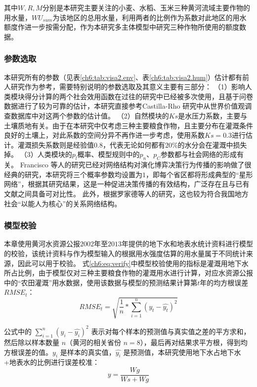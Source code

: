 其中$W, R, M$分别是本研究主要关注的小麦、水稻、玉米三种黄河流域主要作物的用水量，$WU_{sum}$为该地区的总用水量，利用两者的比例作为系数对此地区的用水额度作进一步按需分配，作为本研究多主体模型中研究三种作物所使用的额度数据。



\subsubsection{参数选取}

本研究所有的参数（见表\ref{ch6:tab:visa2.env}、表\ref{ch6:tab:visa2.hum}）估计都有前人研究作为参考，需要特别说明的参数选取及其意义主要有三部分：
（1）影响人类模块得分计算的两个社会效用函数在过往的研究中已经被多次使用，且基于问卷数据进行了较为可靠的估计，本研究直接参考Castilla-Rho 研究中从世界价值观调查数据库中对这两个参数的估计值\cite{castilla-rho2015, castilla-rho2017, castilla-rho2020}。
（2）自然模块的$Ks$是水压力系数，主要与土壤质地有关。由于在本研究中仅考虑三种主要粮食作物，且主要分布在灌溉条件良好的土壤上，对此系数的空间分异不再作进一步考虑，使用系数$Ks = 0.3$进行估计。灌溉损失系数则是经验值$0.8$，代表无论如何都有$20\%$的水分会在灌溉中损失掉。
（3）人类模块的$p_l$概率、模型规则中的$p_n$、$p_C$参数都与社会网络的形成有关。
Francisco 等人的研究已经对网络结构对演化博弈决策行为传播的影响做了很经典的研究\cite{santos2008}，本研究将三个概率参数均设置为$1$，即每个省区都将形成典型的“星形网络”，根据其研究结果，这是一种促进决策传播的有效结构，广泛存在且与已有文献之间具备可对比性\cite{santos2008}。
此外，根据罗家德等人的研究，这也较为符合我国地方社会“以能人为核心”的关系网络结构\cite{luojiade2013}。

\subsubsection{模型校验}

本章使用黄河水资源公报$2002$年至$2013$年提供的地下水和地表水统计资料进行模型的校验，该统计资料与作为模型输入的根据用水强度估算的用水量属于不同统计来源，因此可以用于校验。
式\ref{ch6:eq:verify}中模型校验使用的指标是灌溉用地下水所占比例，由于模型仅对三种主要粮食作物的灌溉用水进行计算，对应水资源公报中的“农田灌溉”用水数据，使用该数据与模型的预测结果计算第$t$年的均方根误差$RMSE_t$：
\begin{equation}
    \label{ch6:eq:rmse}
    RMSE_t = \sqrt{\frac{1}{n}*\sum_{i=1}^{n}{(y_t - \hat{y_t})}^2}
\end{equation}

公式中的 $\sum_{i=1}^{n}{(y_i - \hat{y_i})}^2$ 表示对每个样本的预测值与真实值之差的平方求和，然后除以样本数量 $n$（黄河的相关省份 $n = 8$），最后再对结果求平方根，得到均方根误差的值。$y_i$ 是样本的真实值，$\hat{y_i}$ 是预测值，本研究使用地下水占地下水+地表水的比例进行误差校准：
\begin{equation}
    \label{ch6:eq:verify}
    y = \frac{Wg}{Ws + Wg}
\end{equation}

